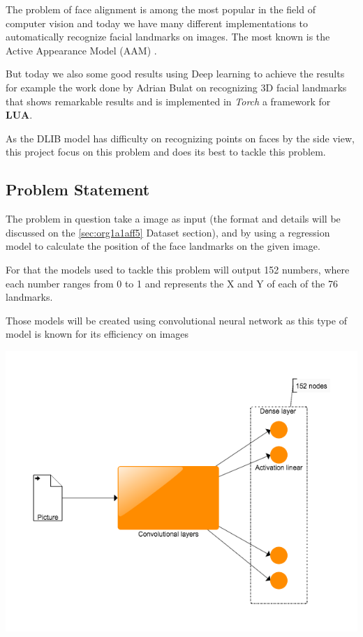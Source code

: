 \documentclass[11pt]{article}
\begin{document}
The problem of face alignment is among the most popular in the field of
computer vision and today we have many different implementations to
automatically recognize facial landmarks on images.
The most known is the Active Appearance Model (AAM)
\cite{edwards1998face,matthews2004active}.

But today we also some good results using Deep learning to achieve the
results for example the work done by Adrian Bulat on recognizing 3D facial
landmarks \cite{bulat2017far} that shows remarkable results and is implemented
in \emph{Torch} a framework for \textbf{LUA}. 

As the DLIB model has difficulty on recognizing points on faces by the side
view, this project focus on this problem and does its best to tackle this
problem.

\subsection{Problem Statement}
\label{sec:orgaef469d}

The problem in question take a image as input (the format and details will be
discussed on the \ref{sec:org1a1aff5} Dataset section), and by using a regression model to
calculate the position of the face landmarks on the given image.

For that the models used to tackle this problem will output 152 numbers, where
each number ranges from 0 to 1 and represents the X and Y of each of the 76
landmarks. 

Those models will be created using convolutional neural network as this type
of model is known for its efficiency on images  

\begin{center}
\includegraphics[width=.9\linewidth]{./images/pipeline.png}
\end{center}
\end{document}
